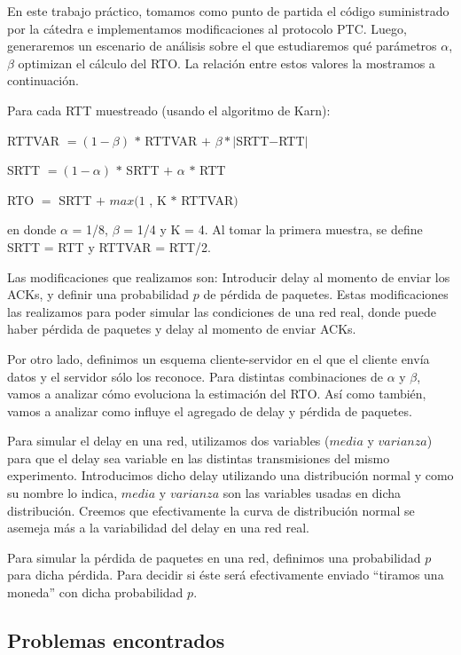 En este trabajo práctico, tomamos como punto de partida el código suministrado por la cátedra e implementamos modificaciones al protocolo PTC. Luego, generaremos un escenario de análisis sobre el que estudiaremos qué parámetros $\alpha$, $\beta$ optimizan el cálculo del RTO. La relación entre estos valores la mostramos a continuación.

Para cada RTT muestreado (usando el algoritmo de Karn):

\indent \indent RTTVAR $= (1-\beta)$ $*$ RTTVAR $ +$ $\beta * |$SRTT$-$RTT$|$

\indent \indent SRTT $= (1-\alpha)$ $*$ SRTT $+$ $\alpha$ $*$ RTT

\indent \indent RTO $=$ SRTT $+$ $max (1$ , K $*$ RTTVAR$)$

en donde $\alpha$ = 1/8, $\beta$ = 1/4 y K = 4. Al tomar la primera muestra, se define SRTT = RTT y RTTVAR = RTT/2.

Las modificaciones que realizamos son: Introducir delay al momento de enviar los ACKs, y definir una probabilidad $p$ de pérdida de paquetes. Estas modificaciones las realizamos para poder simular las condiciones de una red real, donde puede haber pérdida de paquetes y delay al momento de enviar ACKs.

Por otro lado, definimos un esquema cliente-servidor en el que el cliente envía datos y el servidor sólo los reconoce. Para distintas combinaciones de $\alpha$ y $\beta$, vamos a analizar cómo evoluciona la estimación del RTO. Así como también, vamos a analizar como influye el agregado de delay y pérdida de paquetes.

Para simular el delay en una red, utilizamos dos variables ($media$ y $varianza$) para que el delay sea variable en las distintas transmisiones del mismo experimento. Introducimos dicho delay utilizando una distribución normal y como su nombre lo indica, $media$ y $varianza$ son las variables usadas en dicha distribución. Creemos que efectivamente la curva de distribución normal se asemeja m\'as a la variabilidad del delay en una red real.

Para simular la pérdida de paquetes en una red, definimos una probabilidad $p$ para dicha pérdida. Para decidir si éste será efectivamente enviado “tiramos una moneda” con dicha probabilidad $p$.

\subsection{Problemas encontrados}

